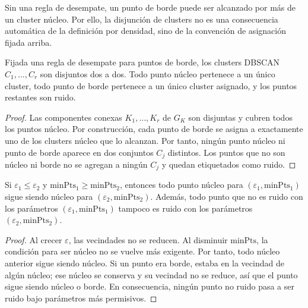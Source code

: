             \begin{observacion}
                Sin una regla de desempate, un punto de borde puede ser alcanzado por más de un cluster núcleo. Por ello, la disjunción de clusters no es una consecuencia automática de la definición por densidad, sino de la convención de asignación fijada arriba.
            \end{observacion}

            \begin{proposicion}
                Fijada una regla de desempate para puntos de borde, los clusters DBSCAN $C_1,\dots,C_r$ son disjuntos dos a dos. Todo punto núcleo pertenece a un único cluster, todo punto de borde pertenece a un único cluster asignado, y los puntos restantes son ruido.
            \end{proposicion}

            \begin{proof}
                Las componentes conexas $K_1,\dots,K_r$ de $G_K$ son disjuntas y cubren todos los puntos núcleo. Por construcción, cada punto de borde se asigna a exactamente uno de los clusters núcleo que lo alcanzan. Por tanto, ningún punto núcleo ni punto de borde aparece en dos conjuntos $C_j$ distintos. Los puntos que no son núcleo ni borde no se agregan a ningún $C_j$ y quedan etiquetados como ruido.
            \end{proof}

            \begin{proposicion}
                Si $\varepsilon_1\le \varepsilon_2$ y $\text{minPts}_1\ge \text{minPts}_2$, entonces todo punto núcleo para $(\varepsilon_1,\text{minPts}_1)$ sigue siendo núcleo para $(\varepsilon_2,\text{minPts}_2)$. Además, todo punto que no es ruido con los parámetros $(\varepsilon_1,\text{minPts}_1)$ tampoco es ruido con los parámetros $(\varepsilon_2,\text{minPts}_2)$.
            \end{proposicion}

            \begin{proof}
                Al crecer $\varepsilon$, las vecindades no se reducen. Al disminuir $\text{minPts}$, la condición para ser núcleo no se vuelve más exigente. Por tanto, todo núcleo anterior sigue siendo núcleo. Si un punto era borde, estaba en la vecindad de algún núcleo; ese núcleo se conserva y su vecindad no se reduce, así que el punto sigue siendo núcleo o borde. En consecuencia, ningún punto no ruido pasa a ser ruido bajo parámetros más permisivos.
            \end{proof}

